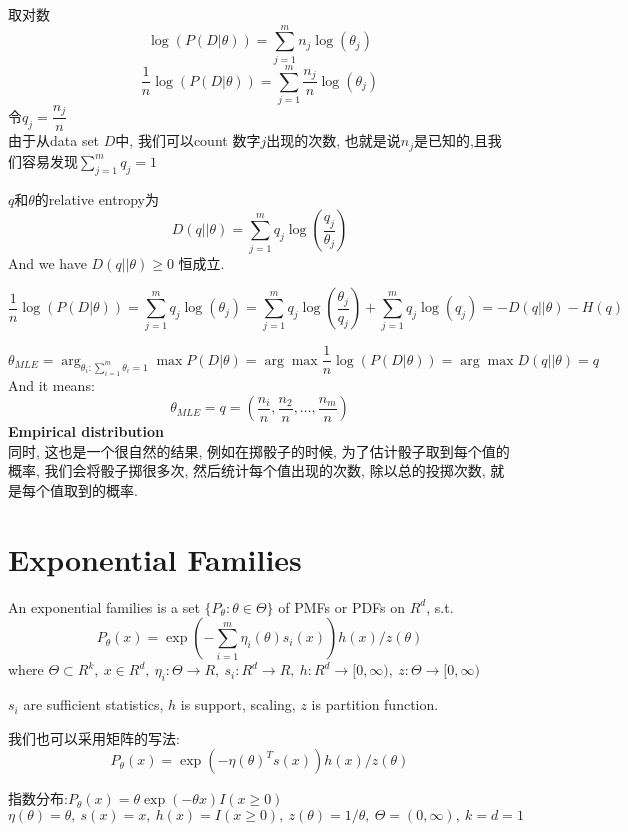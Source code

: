 \documentclass{article}
\begin{document}
取对数
$$ \log(P(D|\theta)) = \sum_{j=1}^m n_j \log(\theta_j) $$
$$ \dfrac{1}{n} \log(P(D|\theta)) = \sum_{j=1}^m \dfrac{n_j}{n} \log(\theta_j) $$
令$q_j = \dfrac{n_j}{n} $\\
由于从data set $D$中, 我们可以count 数字$j$出现的次数, 也就是说$n_j$是已知的,且我们容易发现$\sum_{j=1}^m q_j = 1$

$q$和$\theta$的relative entropy为
$$D(q||\theta) = \sum_{j=1}^m q_j \log(\dfrac{q_j}{\theta_j})$$
And we have $D(q||\theta) \geq 0$ 恒成立.

$$
\dfrac{1}{n} \log(P(D|\theta))
= \sum_{j=1}^m q_j \log(\theta_j)
= \sum_{j=1}^m q_j \log(\dfrac{\theta_j}{q_j}) + \sum_{j=1}^m q_j \log(q_j)
= -D(q||\theta) - H(q)
$$

$$
\theta_{MLE}
= \arg_{\theta_i: \sum_{i=1}^m \theta_i =1} \max P(D|\theta)
= \arg \max \dfrac{1}{n} \log(P(D|\theta))
= \arg \max D(q||\theta)
= q
$$
And it means:
$$\theta_{MLE} = q = (\dfrac{n_i}{n}, \dfrac{n_2}{n}, \ldots, \dfrac{n_m}{n})$$
\textbf{Empirical distribution}\\
同时, 这也是一个很自然的结果, 例如在掷骰子的时候, 为了估计骰子取到每个值的概率, 我们会将骰子掷很多次, 然后统计每个值出现的次数, 除以总的投掷次数, 就是每个值取到的概率.

\section{Exponential Families}
\begin{definition}
An exponential families is a set $\{ P_\theta: \theta \in \Theta \}$ of PMFs or PDFs on $R^d$, s.t.
$$P_\theta(x) = \exp(- \sum_{i=1}^m \eta_i(\theta) s_i(x)) h(x)/z(\theta)$$
where
$\Theta \subset R^k,\ x \in R^d,\ \eta_i: \Theta \rightarrow R,\ s_i:R^d \rightarrow R,\ h: R^d \rightarrow [0, \infty),\ z: \Theta \rightarrow [0, \infty)$
\end{definition}
$s_i$ are sufficient statistics, $h$ is support, scaling, $z$ is partition function.

我们也可以采用矩阵的写法:
$$P_\theta(x) = \exp(- \eta(\theta)^T s(x)) h(x)/z(\theta)$$

\begin{example}
指数分布:$P_\theta(x) = \theta \exp(-\theta x) I(x \geq 0)$\\
$\eta(\theta) = \theta,\ s(x) = x,\ h(x) = I(x \geq 0),\ z(\theta) = 1/\theta,\ \Theta = (0, \infty),\ k=d=1$
\end{example}
\end{document}
